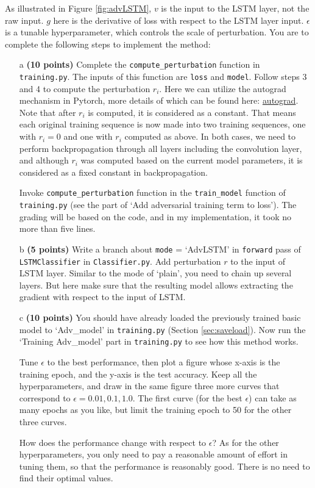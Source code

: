 \documentclass[11pt]{report}
\begin{document}
As illustrated in Figure \ref{fig:advLSTM}, $v$ is the input to the LSTM layer, not the raw input. 
$g$ here is the derivative of loss with respect to the LSTM layer input. $\epsilon$ is a tunable hyperparameter, which controls the scale of perturbation. 
You are to complete the following steps to implement the method:

\begin{itemize}
    \item[a] \textbf{(10 points)} Complete the \texttt{compute\_perturbation} function in \texttt{training.py}. The inputs of this function are \texttt{loss} and \texttt{model}. Follow steps 3 and 4 to compute the perturbation $r_i$. 
    Here we can utilize the autograd mechanism in Pytorch, 
    more details of which can be found here: \href{https://pytorch.org/docs/stable/autograd.html}{autograd}. 
    Note that after $r_i$ is computed,
    it is considered as a constant.
    That means each original training sequence is now made into two training sequences, one with $r_i = 0$ and one with $r_i$ computed as above.
    In both cases, we need to perform backpropagation through all layers including the convolution layer,
    and although $r_i$ was computed based on the current model parameters,
    it is considered as a fixed constant in backpropagation.

    Invoke \texttt{compute\_perturbation} function in the \texttt{train\_model} function of \texttt{training.py} (see the part of `Add adversarial training term to loss').
    The grading will be based on the code,
    and in my implementation,
    it took no more than five lines.
    \item[b] \textbf{(5 points)} 
    Write a branch about \texttt{mode} = `AdvLSTM' in \texttt{forward} pass of \texttt{LSTMClassifier} in \texttt{Classifier.py}. 
    Add perturbation $r$ to the input of LSTM layer.
    Similar to the mode of `plain', you need to chain up several layers.
    But here make sure that the resulting model allows extracting the gradient with respect to the input of LSTM.
    \item[c] \textbf{(10 points)} You should have already loaded the previously trained basic model to `Adv\_model' in \texttt{training.py} (Section \ref{sec:saveload}). 
    Now run the `Training Adv\_model' part in \texttt{training.py} to see how this method works. 
    
    Tune $\epsilon$ to the best performance, 
    then plot a figure whose x-axis is the training epoch, 
    and the y-axis is the test accuracy. 
    Keep all the hyperparameters, 
    and draw in the same figure three more curves that correspond to  $\epsilon = {0.01, 0.1, 1.0}$.
    The first curve (for the best $\epsilon$) can take as many epochs as you like, 
    but limit the training epoch to 50 for the other three curves.

    How does the performance change with respect to $\epsilon$?
    As for the other hyperparameters,
    you only need to pay a reasonable amount of effort in tuning them, 
    so that the performance is reasonably good.
    There is no need to find their optimal values.
\end{itemize}
\end{document}
